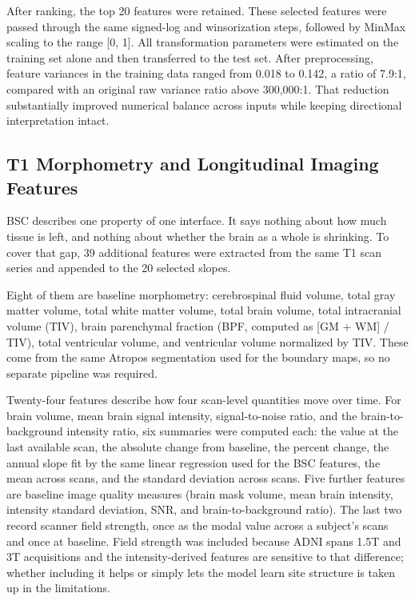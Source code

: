 \documentclass[blue]{ludusofficial}  %
\begin{document}
After ranking, the top 20 features were retained. These selected features were passed through the same signed-log and winsorization steps, followed by MinMax scaling to the range [0, 1]. All transformation parameters were estimated on the training set alone and then transferred to the test set. After preprocessing, feature variances in the training data ranged from 0.018 to 0.142, a ratio of 7.9:1, compared with an original raw variance ratio above 300{,}000:1. That reduction substantially improved numerical balance across inputs while keeping directional interpretation intact.

\subsection{T1 Morphometry and Longitudinal Imaging Features}

BSC describes one property of one interface. It says nothing about how much tissue is left, and nothing about whether the brain as a whole is shrinking. To cover that gap, 39 additional features were extracted from the same T1 scan series and appended to the 20 selected slopes.

Eight of them are baseline morphometry: cerebrospinal fluid volume, total gray matter volume, total white matter volume, total brain volume, total intracranial volume (TIV), brain parenchymal fraction (BPF, computed as [GM + WM] / TIV), total ventricular volume, and ventricular volume normalized by TIV. These come from the same Atropos segmentation used for the boundary maps, so no separate pipeline was required.

Twenty-four features describe how four scan-level quantities move over time. For brain volume, mean brain signal intensity, signal-to-noise ratio, and the brain-to-background intensity ratio, six summaries were computed each: the value at the last available scan, the absolute change from baseline, the percent change, the annual slope fit by the same linear regression used for the BSC features, the mean across scans, and the standard deviation across scans. Five further features are baseline image quality measures (brain mask volume, mean brain intensity, intensity standard deviation, SNR, and brain-to-background ratio). The last two record scanner field strength, once as the modal value across a subject's scans and once at baseline. Field strength was included because ADNI spans 1.5T and 3T acquisitions and the intensity-derived features are sensitive to that difference; whether including it helps or simply lets the model learn site structure is taken up in the limitations.
\end{document}
